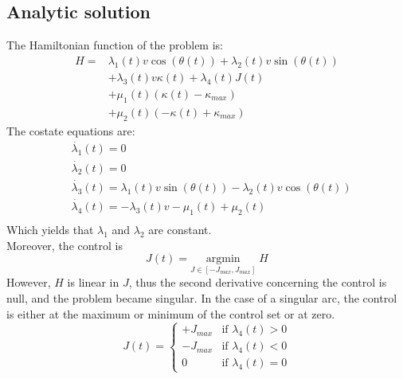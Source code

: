 \documentclass[11pt,twocolumn]{scrartcl}
\begin{document}
\subsection*{Analytic solution}
%
The Hamiltonian function of the problem is:
%
\begin{equation}
  \begin{split}
    H = &\lambda_1(t) v \cos(\theta(t)) + \lambda_2(t) v \sin(\theta(t)) \\
        &+ \lambda_3(t) v \kappa(t) + \lambda_4(t) J(t)\\
        &+ \mu_1(t) (\kappa(t)-\kappa_{max}) \\ 
        &+ \mu_2(t) (-\kappa(t)+\kappa_{max})
  \end{split}
\end{equation}
%
The costate equations are:
%
\begin{equation}
  \begin{split}
    &\dot{\lambda_1}(t) = 0 \\
    &\dot{\lambda_2}(t) = 0 \\
    &\dot{\lambda_3}(t) = \lambda_1(t) v \sin(\theta(t)) - \lambda_2(t) v \cos(\theta(t)) \\
    &\dot{\lambda_4}(t) = -\lambda_3(t) v -\mu_1(t) + \mu_2(t) \\
  \end{split}
\end{equation}
%
Which yields that $\lambda_1$ and $\lambda_2$ are constant.\\
Moreover, the control is
%
\begin{equation}
  J(t) = \underset{ J \in [-J_{max},J_{max}]}{ \textrm{argmin} } \; H 
\end{equation}
%
However, $H$ is linear in $J$, thus the second derivative concerning the control is null, and the problem became singular. In the case of a singular arc, the control is either at the maximum or minimum of the control set or at zero.
%
\begin{equation}
  J(t) = \begin{cases}
    +J_{max} & \text{if } \lambda_4(t) > 0 \\
    -J_{max} & \text{if } \lambda_4(t) < 0 \\
    0 & \text{if } \lambda_4(t) = 0
  \end{cases}
\end{equation}
%
\end{document}
